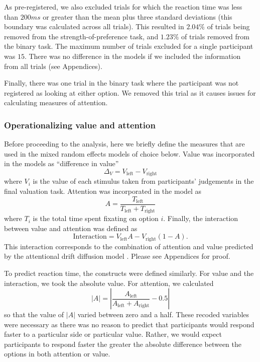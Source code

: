 \documentclass[doc, a4paper, apacite]{apa6}
\begin{document}
As pre-registered, we also excluded trials for which the reaction time was less than $200ms$ or greater than the mean plus three standard deviations (this boundary was calculated across all trials). This resulted in $2.04\%$ of trials being removed from the strength-of-preference task, and $1.23\%$ of trials removed from the binary task. The maximum number of trials excluded for a single participant was $15$. There was no difference in the models if we included the information from all trials (see Appendices). 

Finally, there was one trial in the binary task where the participant was not registered as looking at either option. We removed this trial as it causes issues for calculating measures of attention. 

\subsubsection{Operationalizing value and attention}
Before proceeding to the analysis, here we briefly define the measures that are used in the mixed random effects models of choice below. Value was incorporated in the models as ``difference in value'' 
\begin{equation}
	\Delta_V = V_\text{left} - V_\text{right}
\end{equation}
where $V_i$ is the value of each stimulus taken from participants' judgements in the final valuation task. Attention was incorporated in the model as 
\begin{equation}
	A = \frac{T_\text{left}}{T_\text{left}+T_\text{right}}
\end{equation}
where $T_i$ is the total time spent fixating on option $i$. Finally, the interaction between value and attention was defined as
\begin{equation}
	\text{Interaction} = V_\text{left} A - V_\text{right} (1-A).
\end{equation}
This interaction corresponds to the combination of attention and value predicted by the attentional drift diffusion model \cite{Krajbich2010}. Please see Appendices for proof. 

To predict reaction time, the constructs were defined similarly. For value and the interaction, we took the absolute value. For attention, we calculated
\begin{equation}
	|A| = \left| \frac{A_\text{left}}{A_\text{left}+A_\text{right}} - 0.5 \right| 
\end{equation}
so that the value of $|A|$ varied between zero and a half. These recoded variables were necessary as there was no reason to predict that participants would respond faster to a particular side or particular value. Rather, we would expect participants to respond faster the greater the absolute difference between the options in both attention or value. 
\end{document}
